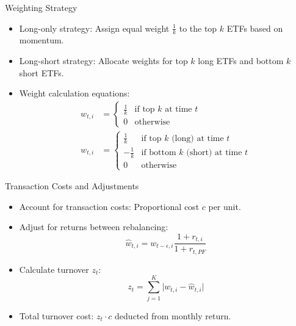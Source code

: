 \documentclass{beamer}
\begin{document}
\begin{frame}[t]{Weighting Strategy}
    \begin{itemize}
        \item Long-only strategy: Assign equal weight $\frac{1}{k}$ to the top $k$ ETFs based on momentum.
        \item Long-short strategy: Allocate weights for top $k$ long ETFs and bottom $k$ short ETFs.
        \item Weight calculation equations:
        \begin{align}
            w_{t,i} &= \begin{cases} 
            \frac{1}{k} & \text{if top } k \text{ at time } t \\
            0           & \text{otherwise}
            \end{cases} \\
            w_{t,i} &= \begin{cases} 
            \frac{1}{k}  & \text{if top } k \text{ (long) at time } t \\
            -\frac{1}{k} & \text{if bottom } k \text{ (short) at time } t \\
            0            & \text{otherwise}
            \end{cases}
        \end{align}
    \end{itemize}
\end{frame}


\begin{frame}[t]{Transaction Costs and Adjustments}
    \begin{itemize}
        \item Account for transaction costs: Proportional cost $c$ per unit.
        \item Adjust for returns between rebalancing:
        \begin{equation}
            \hat{w}_{t,i} = w_{t-\epsilon,i} \frac{1 + r_{t,i}}{1 + r_{t,PF}}
        \end{equation}
        \item Calculate turnover $z_t$:
        \begin{equation}
            z_{t} = \sum_{j=1}^{K}\lvert w_{t,i} - \hat{w}_{t,i} \rvert
        \end{equation}
        \item Total turnover cost: $z_t \cdot c$ deducted from monthly return.
    \end{itemize}
\end{frame}
\end{document}
